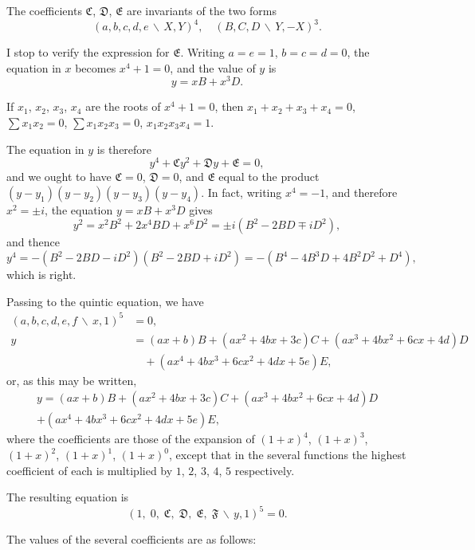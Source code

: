 \documentclass[11pt,a4paper]{article}
\theoremstyle{definition}
\begin{document}
\newpage

The coefficients $\mathfrak{C}$, $\mathfrak{D}$, $\mathfrak{E}$ are invariants of the two forms
\[(a,b,c,d,e\,\backslash\!\!\,X,Y)^{4}, \quad (B,C,D\,\backslash\!\!\,Y,-X)^{3}.\]

I stop to verify the expression for $\mathfrak{E}$. Writing $a=e=1$, $b=c=d=0$, the
equation in $x$ becomes $x^{4}+1=0$, and the value of $y$ is
\[y = xB + x^{3}D.\]

If $x_{1}$, $x_{2}$, $x_{3}$, $x_{4}$ are the roots of $x^{4}+1=0$, then
$x_{1}+x_{2}+x_{3}+x_{4}=0$,
$\sum x_{1}x_{2}=0$,
$\sum x_{1}x_{2}x_{3}=0$,
$x_{1}x_{2}x_{3}x_{4}=1$.

The equation in $y$ is therefore
\[y^{4} + \mathfrak{C}y^{2} + \mathfrak{D}y + \mathfrak{E} = 0,\]
and we ought to have $\mathfrak{C}=0$, $\mathfrak{D}=0$, and $\mathfrak{E}$ equal to the
product $(y-y_{1})(y-y_{2})(y-y_{3})(y-y_{4})$. In fact, writing $x^{4}=-1$, and therefore
$x^{2}=\pm i$, the equation $y=xB+x^{3}D$ gives
\[y^{2} = x^{2}B^{2} + 2x^{4}BD + x^{6}D^{2} = \pm i(B^{2}-2BD \mp iD^{2}),\]
and thence
\[y^{4} = -(B^{2}-2BD-iD^{2})(B^{2}-2BD+iD^{2}) = -(B^{4}-4B^{3}D+4B^{2}D^{2}+D^{4}),\]
which is right.

Passing to the quintic equation, we have
\begin{align*}
(a,b,c,d,e,f\,\backslash\!\!\,x,1)^{5} &= 0,\\
y &= (ax+b)B + (ax^{2}+4bx+3c)C + (ax^{3}+4bx^{2}+6cx+4d)D \\
&\quad + (ax^{4}+4bx^{3}+6cx^{2}+4dx+5e)E,
\end{align*}
or, as this may be written,
\begin{multline*}
y = (ax+b)B + (ax^{2}+4bx+3c)C + (ax^{3}+4bx^{2}+6cx+4d)D \\
+ (ax^{4}+4bx^{3}+6cx^{2}+4dx+5e)E,
\end{multline*}
where the coefficients are those of the expansion of $(1+x)^{4}$, $(1+x)^{3}$, $(1+x)^{2}$,
$(1+x)^{1}$, $(1+x)^{0}$, except that in the several functions the highest coefficient of
each is multiplied by $1$, $2$, $3$, $4$, $5$ respectively.

The resulting equation is
\[(1,\; 0,\; \mathfrak{C},\; \mathfrak{D},\; \mathfrak{E},\; \mathfrak{F}\,\backslash\!\!\,y,1)^{5} = 0.\]

\newpage

The values of the several coefficients are as follows:
\end{document}
